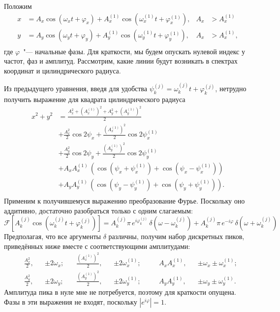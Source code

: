 \documentclass[tikz]{trlnotes}
\begin{document}
Положим
\begin{equation}
  \begin{aligned}
    x &= A_x \cos (\omega_x t + φ_x) + A_x^{(1)} \cos(\omega_x^{(1)} t + φ_x^{(1)}), & A_x &> A_x^{(1)} \\
    y &= A_y \cos (\omega_y t + φ_y) + A_y^{(1)} \cos(\omega_y^{(1)} t + φ_y^{(1)}), & A_x &> A_x^{(1)}, \\
  \end{aligned}
\end{equation}
где $φ$~"--- начальные фазы. Для краткости, мы будем опускать нулевой индекс у частот, фаз и амплитуд.
Рассмотрим, какие линии будут возникать в спектрах координат и цилиндрического радиуса. 

Из предыдущего уравнения, введя для удобства $ψ_k^{(j)} = ω_k^{(j)}t + φ_k^{(j)}$,
нетрудно получить выражение для квадрата цилиндрического радиуса
\begin{equation}
  \label{eq:xsqysqexpansion}
  \begin{split}
    x^2 + y^2  &= \frac{A_x^2 + \left(A_x^{(1)}\right)^2 + A_y^2 + \left(A_y^{(1)}\right)^2}{2} \\
               &+ \frac{A_x^2}{2} \cos 2ψ_x + \frac{\left(A_x^{(1)}\right)^2}{2} \cos 2ψ_x^{(1)} \\
         &+ \frac{A_y^2}{2} \cos 2ψ_y + \frac{\left(A_y^{(1)}\right)^2}{2} \cos 2ψ_y^{(1)} \\
         &+ A_x A_x^{(1)} \, \left( \cos (ψ_x + ψ_x^{(1)}) + \cos (ψ_x - ψ_x^{(1)}) \right) \\
         &+ A_y A_y^{(1)} \, \left( \cos (ψ_y - ψ_y^{(1)}) + \cos (ψ_y + ψ_y^{(1)}) \right). \\
  \end{split}
\end{equation}
Применим к получившемуся выражению преобразование Фурье. Поскольку оно аддитивно, достаточно разобраться только
с одним слагаемым:
\begin{equation}\label{eq:fftcos}
  \mathcal{F}\left[A_k^{(j)} \cos (ω_k^{(j)}t + φ_k^{(j)})\right] = 
  A_k^{(j)}\pi \, e^{iφ_{k}^{(j)}}\,δ(ω-ω_k^{(j)}) + A_k^{(j)}\pi\,e^{-iφ}\,δ(ω + ω_k^{(j)})
\end{equation}
Предполагая, что все аргументы $δ$ различны, получим набор дискретных пиков, приведённых ниже вместе с
соответствующими амплитудами:
\begin{equation}
  \label{eq:twooscpeaks}
  \begin{aligned}
    &\frac{A_x^2}{2}, & & \pm 2\omega_x;\quad
    &\frac{\left(A_x^{(1)}\right)^2}{2}, & & \pm 2\omega_x^{(1)};\quad
    &&A_x A_x^{(1)}, & & \pm \omega_x \pm \omega_x^{(1)}; \\
    &\frac{A_y^2}{2}, & & \pm 2\omega_y;\quad
    &\frac{\left(A_y^{(1)}\right)^2}{2}, & & \pm 2\omega_y^{(1)};\quad
    &&A_y A_y^{(1)}, & & \pm \omega_y \pm \omega_y^{(1)}.
  \end{aligned}
\end{equation}
Амплитуда пика в нуле мне не потребуется, поэтому для краткости опущена.
Фазы в эти выражения не входят, поскольку $|e^{iφ}|=1$.
\end{document}
